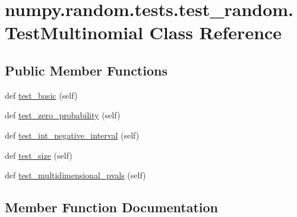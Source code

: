 \hypertarget{classnumpy_1_1random_1_1tests_1_1test__random_1_1TestMultinomial}{}\section{numpy.\+random.\+tests.\+test\+\_\+random.\+Test\+Multinomial Class Reference}
\label{classnumpy_1_1random_1_1tests_1_1test__random_1_1TestMultinomial}
\subsection*{Public Member Functions}
\begin{DoxyCompactItemize}
\item 
def \hyperlink{classnumpy_1_1random_1_1tests_1_1test__random_1_1TestMultinomial_ae20d90a1606df21aa4919cd74db0f904}{test\+\_\+basic} (self)
\item 
def \hyperlink{classnumpy_1_1random_1_1tests_1_1test__random_1_1TestMultinomial_a8a2dfb5e2b73cdaf9fa0f7bf9e504fd6}{test\+\_\+zero\+\_\+probability} (self)
\item 
def \hyperlink{classnumpy_1_1random_1_1tests_1_1test__random_1_1TestMultinomial_a0733471b32a95e9bf29fbbc5a1d1810d}{test\+\_\+int\+\_\+negative\+\_\+interval} (self)
\item 
def \hyperlink{classnumpy_1_1random_1_1tests_1_1test__random_1_1TestMultinomial_a29c5033de9d493a14d6a1c391e15bb67}{test\+\_\+size} (self)
\item 
def \hyperlink{classnumpy_1_1random_1_1tests_1_1test__random_1_1TestMultinomial_aeed8849699a2fe59ed09bc687258c7e6}{test\+\_\+multidimensional\+\_\+pvals} (self)
\end{DoxyCompactItemize}


\subsection{Member Function Documentation}
\mbox{\label{classnumpy_1_1random_1_1tests_1_1test__random_1_1TestMultinomial_ae20d90a1606df21aa4919cd74db0f904}} 
